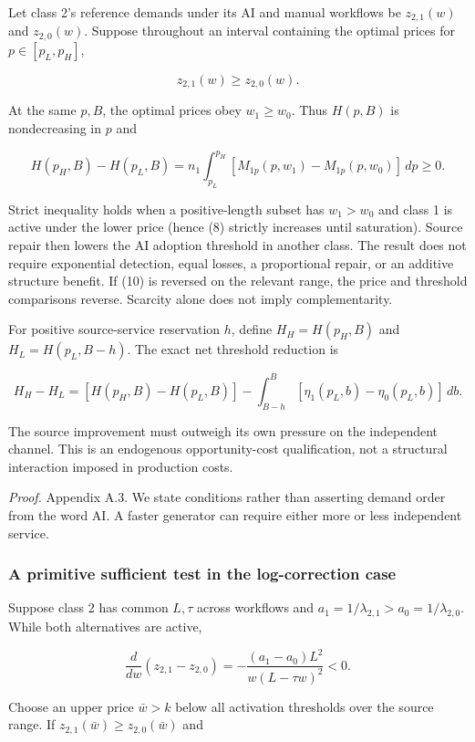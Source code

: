\documentclass[
  11pt,
  a4paper,
]{article}
\begin{document}
Let class 2's reference demands under its AI and manual workflows be
\(z_{2,1}(w)\) and \(z_{2,0}(w)\). Suppose throughout an interval
containing the optimal prices for \(p\in[p_L,p_H]\),

\[z_{2,1}(w)\geq z_{2,0}(w). \tag{10}\]

At the same \(p,B\), the optimal prices obey \(w_1\geq w_0\). Thus
\(H(p,B)\) is nondecreasing in \(p\) and

\[H(p_H,B)-H(p_L,B)
=n_1\int_{p_L}^{p_H}\!
 [M_{1p}(p,w_1)-M_{1p}(p,w_0)]\,dp\geq0. \tag{11}\]

Strict inequality holds when a positive-length subset has \(w_1>w_0\)
and class 1 is active under the lower price (hence (8) strictly
increases until saturation). Source repair then lowers the AI adoption
threshold in another class. The result does not require exponential
detection, equal losses, a proportional repair, or an additive structure
benefit. If (10) is reversed on the relevant range, the price and
threshold comparisons reverse. Scarcity alone does not imply
complementarity.

For positive source-service reservation \(h\), define \(H_H=H(p_H,B)\)
and \(H_L=H(p_L,B-h)\). The exact net threshold reduction is

\[H_H-H_L=[H(p_H,B)-H(p_L,B)]
 -\int_{B-h}^{B}[\eta_1(p_L,b)-\eta_0(p_L,b)]\,db. \tag{12}\]

The source improvement must outweigh its own pressure on the independent
channel. This is an endogenous opportunity-cost qualification, not a
structural interaction imposed in production costs.

\emph{Proof.} Appendix A.3. We state conditions rather than asserting
demand order from the word AI. A faster generator can require either
more or less independent service.

\hypertarget{a-primitive-sufficient-test-in-the-log-correction-case}{%
\subsubsection{A primitive sufficient test in the log-correction
case}\label{a-primitive-sufficient-test-in-the-log-correction-case}}

Suppose class 2 has common \(L,\tau\) across workflows and
\(a_1=1/\lambda_{2,1}>a_0=1/\lambda_{2,0}\). While both alternatives are
active,

\[\frac{d}{dw}(z_{2,1}-z_{2,0})
=-\frac{(a_1-a_0)L^2}{w(L-\tau w)^2}<0. \tag{13}\]

Choose an upper price \(\bar w>k\) below all activation thresholds over
the source range. If \(z_{2,1}(\bar w)\geq z_{2,0}(\bar w)\) and
\end{document}
